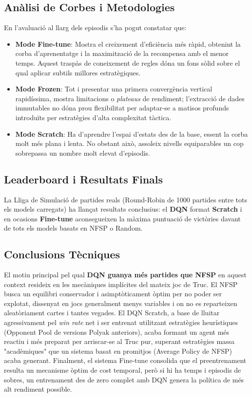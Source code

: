 \documentclass[a4paper,11pt]{article}
\begin{document}
\subsection{Anàlisi de Corbes i Metodologies}
En l'avaluació al llarg dels episodis s'ha pogut constatar que:
\begin{itemize}
    \item \textbf{Mode Fine-tune}: Mostra el creixement d'eficiència més ràpid, obtenint la corba d'aprenentatge i la maximització de la recompensa amb el menor temps. Aquest traspàs de coneixement de regles dóna un fons sòlid sobre el qual aplicar subtils millores estratègiques.
    \item \textbf{Mode Frozen}: Tot i presentar una primera convergència vertical rapidíssima, mostra limitacions o \textit{plateaus} de rendiment; l'extracció de dades immutables no dóna prou flexibilitat per adaptar-se a matisos profunds introduïts per estratègies d'alta complexitat tàctica.
    \item \textbf{Mode Scratch}: Ha d'aprendre l'espai d'estats des de la base, essent la corba molt més plana i lenta. No obstant això, assoleix nivells equiparables un cop sobrepassa un nombre molt elevat d'episodis.
\end{itemize}

\subsection{Leaderboard i Resultats Finals}
La Lliga de Simulació de partides reals (Round-Robin de 1000 partides entre tots els models carregats) ha llançat resultats conclusius: el \textbf{DQN} format \textbf{Scratch} i en ocasions \textbf{Fine-tune} aconsegueixen la màxima puntuació de victòries davant de tots els models basats en NFSP o Random.

\subsection{Conclusions Tècniques}
El motiu principal pel qual \textbf{DQN guanya més partides que NFSP} en aquest context resideix en les mecàniques implícites del mateix joc de Truc. El NFSP busca un equilibri conservador i asimptòticament òptim per no poder ser explotat, dissenyat en jocs generalment menys variables i on no es reparteixen aleatòriament cartes i tantes vegades. El DQN Scratch, a base de lluitar agressivament pel \textit{win rate} net i ser entrenat utilitzant estratègies heurístiques (Opponent Pool de versions Polyak anteriors), acaba formant un agent més reactiu i més preparat per arriscar-se al Truc pur, superant estratègies massa "acadèmiques" que un sistema basat en promitjos (Average Policy de NFSP) acaba generant. Finalment, el sistema Fine-tune consolida que el preentrenament resulta un mecanisme òptim de cost temporal, però si hi ha temps i episodis de sobres, un entrenament des de zero complet amb DQN genera la política de més alt rendiment possible.
\end{document}
